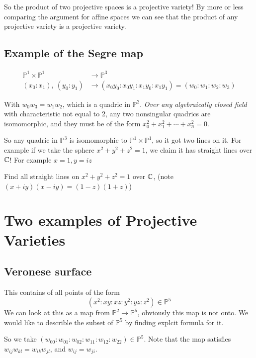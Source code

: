 So the product of two projective spaces is a projective variety! By more or less comparing the argument for affine spaces we can see that the product of any projective variety is a projective variety.


\subsection{Example of the Segre map}
\begin{align*}
    \mathbb{P}^1\times \mathbb{P}^1 &\rightarrow \mathbb{P}^3\\
    (x_0\colon x_1), \ (y_0\colon y_1) &\rightarrow (x_0y_0\colon x_0y_1\colon x_1y_0\colon x_1y_1) = (w_0\colon w_1\colon w_2\colon w_3)     
\end{align*}

With $w_0w_3 = w_1w_2$, which is a quadric in $\mathbb{P}^2$. \textit{Over any algebraically closed field} with characteristic not equal to 2, any two nonsingular quadrics are isomomorphic, and they must be of the form $x_0^2+x_1^2+\cdots+x_n^2 = 0$.

So any quadric in $\mathbb{P}^3$ is isomomorphic to $\mathbb{P}^1\times \mathbb{P}^1$, so it got two lines on it. For example if we take the sphere $x^2+y^2+z^2 = 1$, we claim it has straight lines over $\mathbb{C}$! For example $x = 1, y=iz$

\begin{exercise}

Find all straight lines on $x^2+y^2+z^2 = 1$ over $\mathbb{C}$, (note $(x+iy)(x-iy) = (1-z)(1+z)$)
\end{exercise}

\section{Two examples of Projective Varieties}

\subsection{Veronese surface}
This contains of all points of the form \[(x^2\colon xy\colon xz\colon y^2\colon yz\colon z^2)\in \mathbb{P}^5\]
We can look at this as a map from $\mathbb{P}^2\rightarrow \mathbb{P}^5$, obviously this map is not onto. We would like to describle the subset of $\mathbb{P}^5$ by finding explcit formula for it.


So we take $(w_{00}\colon w_{01}\colon w_{02}\colon w_{11}\colon w_{12}\colon w_{22})\in \mathbb{P}^5$. Note that the map satisfies $w_{ij}w_{kl} = w_{ik}w_{jl}$, and $w_{ij} = w_{ji}$.

